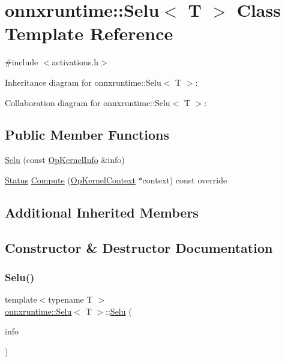 \hypertarget{classonnxruntime_1_1Selu}{}\section{onnxruntime\+:\+:Selu$<$ T $>$ Class Template Reference}
\label{classonnxruntime_1_1Selu}


{\ttfamily \#include $<$activations.\+h$>$}



Inheritance diagram for onnxruntime\+:\+:Selu$<$ T $>$\+:


Collaboration diagram for onnxruntime\+:\+:Selu$<$ T $>$\+:
\subsection*{Public Member Functions}
\begin{DoxyCompactItemize}
\item 
\mbox{\hyperlink{classonnxruntime_1_1Selu_ae8d5d1c469b3ba735ca2c27ee4b7aeda}{Selu}} (const \mbox{\hyperlink{classonnxruntime_1_1OpKernelInfo}{Op\+Kernel\+Info}} \&info)
\item 
\mbox{\hyperlink{classonnxruntime_1_1common_1_1Status}{Status}} \mbox{\hyperlink{classonnxruntime_1_1Selu_a05cc73e0b910439864ba33b66537ca6e}{Compute}} (\mbox{\hyperlink{classonnxruntime_1_1OpKernelContext}{Op\+Kernel\+Context}} $\ast$context) const override
\end{DoxyCompactItemize}
\subsection*{Additional Inherited Members}


\subsection{Constructor \& Destructor Documentation}
\mbox{\label{classonnxruntime_1_1Selu_ae8d5d1c469b3ba735ca2c27ee4b7aeda}} 
\subsubsection{\texorpdfstring{Selu()}{Selu()}}
{\footnotesize\ttfamily template$<$typename T $>$ \\
\mbox{\hyperlink{classonnxruntime_1_1Selu}{onnxruntime\+::\+Selu}}$<$ T $>$\+::\mbox{\hyperlink{classonnxruntime_1_1Selu}{Selu}} (\begin{DoxyParamCaption}\item[{const \mbox{\hyperlink{classonnxruntime_1_1OpKernelInfo}{Op\+Kernel\+Info}} \&}]{info }\end{DoxyParamCaption})\hspace{0.3cm}{\ttfamily [inline]}}



